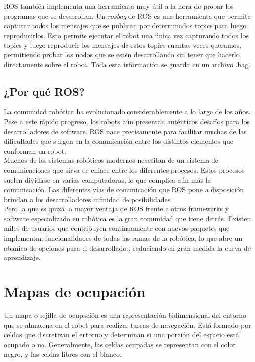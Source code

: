 ROS también implementa una herramienta muy útil a la hora de probar los programas que se desarrollan. Un \textit{rosbag} de ROS es una herramienta que permite capturar todos los mensajes que se publican por determinados topics para luego reproducirlos. Esto permite ejecutar el robot una única vez capturando todos los topics y luego reproducir los mensajes de estos topics cuantas veces queramos, permitiendo probar los nodos que se estén desarrollando sin tener que hacerlo directamente sobre el robot. Toda esta información se guarda en un archivo .bag. \cite{roswiki}\\

\subsection{¿Por qué ROS?}

La comunidad robótica ha evolucionado considerablemente a lo largo de los años. Pese a  este rápido progreso, los robots aún presentan auténticos desafíos para los desarrolladores de software. ROS nace precisamente para facilitar muchas de las dificultades que surgen en la comunicación entre los distintos elementos que conforman un robot.\\

Muchos de los sistemas robóticos modernos necesitan de un sistema de comunicaciones que sirva de enlace entre los diferentes procesos. Estos procesos suelen dividirse en varias computadoras, lo que complica aún más la comunicación. Las diferentes vías de comunicación que ROS pone a disposición brindan a los desarrolladores infinidad de posibilidades.\\

Pero la que es quizá la mayor ventaja de ROS frente a otros frameworks y software especializado en robótica es la gran comunidad que tiene detrás. Existen miles de usuarios que contribuyen continuamente con nuevos paquetes que implementan funcionalidades de todas las ramas de la robótica, lo que abre un abanico de opciones para el desarrollador, reduciendo en gran medida la curva de aprendizaje.\\

\section{Mapas de ocupación}

Un mapa o rejilla de ocupación es una representación bidimensional del entorno que se almacena en el robot para realizar tareas de navegación. Está formado por celdas que discretizan el entorno y determinan si una porción del espacio está ocupado o no. Generalmente, las celdas ocupadas se representan con el color negro, y las celdas libres con el blanco.\\

